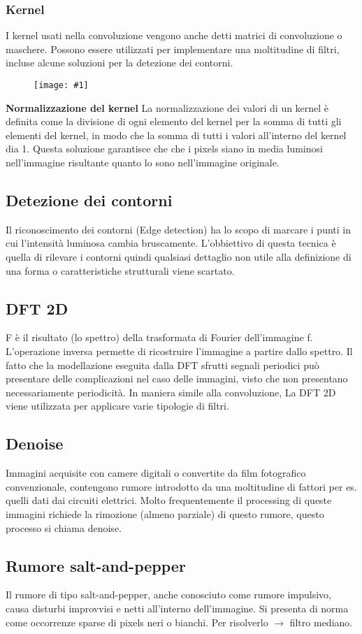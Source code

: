 \documentclass[8pt,a4paper]{article}
\newcommand{\f}[1]{
      \begin{figure}[H]
        \center
      \texttt{[image: \#1]}
      \end{figure}
}
\begin{document}
\begin{multicols}{5}
    \subsubsection{Kernel}
    I kernel usati nella convoluzione vengono anche detti matrici di convoluzione
    o maschere. Possono essere utilizzati per implementare una moltitudine di filtri,
    incluse alcune soluzioni per la detezione dei contorni.
    \f{kernels}
    \textbf{Normalizzazione del kernel} 
    La normalizzazione dei valori di un kernel è definita come la divisione di ogni 
    elemento del kernel per la somma di tutti gli elementi del kernel, in modo che 
    la somma di tutti i valori all’interno del kernel dia 1. Questa soluzione garantisce 
    che che i pixels siano in media luminosi nell’immagine risultante quanto lo sono 
    nell’immagine originale.
    \subsection{Detezione dei contorni}
    Il riconoscimento dei contorni (Edge detection) ha lo scopo di marcare i punti in 
    cui l'intensità luminosa cambia bruscamente. L'obbiettivo di questa tecnica è quella
    di rilevare i contorni quindi qualsiasi dettaglio non utile alla definizione di una
    forma o caratteristiche strutturali viene scartato.
    \subsection{DFT 2D}
    F è il risultato (lo spettro) della trasformata di Fourier dell'immagine f.
    L’operazione inversa permette di ricostruire l’immagine a partire dallo spettro.
    Il fatto che la modellazione eseguita dalla DFT sfrutti segnali periodici può 
    presentare delle complicazioni nel caso delle immagini, visto che non presentano 
    necessariamente periodicità. In maniera simile alla convoluzione, La DFT 2D 
    viene utilizzata per applicare varie tipologie di filtri.
    \subsection{Denoise}
    Immagini acquisite con camere digitali o convertite da film fotografico 
    convenzionale, contengono rumore introdotto da una moltitudine di fattori per es.
    quelli dati dai circuiti elettrici. Molto frequentemente il processing di queste 
    immagini richiede la rimozione (almeno parziale) di questo rumore, questo processo
    si chiama denoise.
    \subsection{Rumore salt-and-pepper}
    Il rumore di tipo salt-and-pepper, anche conosciuto come rumore impulsivo, causa 
    disturbi improvvisi e netti all’interno dell’immagine. Si presenta di norma come 
    occorrenze sparse di pixels neri o bianchi. Per risolverlo $\rightarrow$ filtro
    mediano.

\end{multicols}
\end{document}
